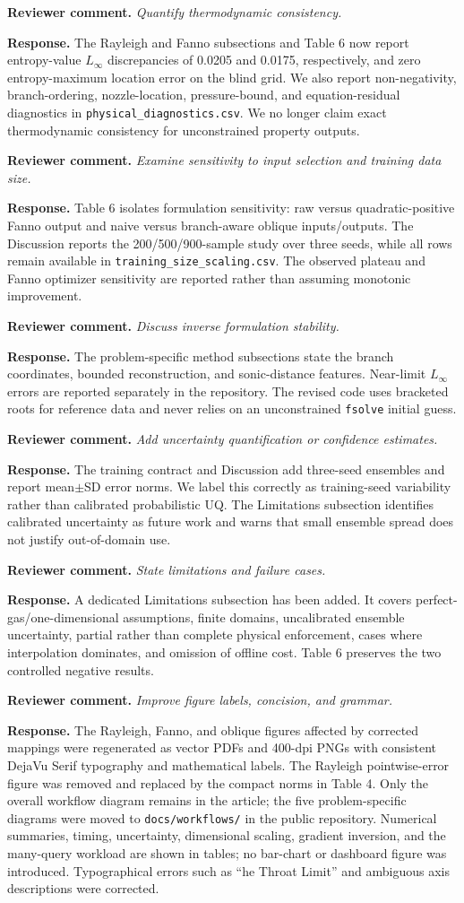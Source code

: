 \documentclass[11pt]{article}
\newcommand{\comment}[1]{\par\medskip\noindent\textbf{Reviewer comment.} \emph{#1}\par}
\newcommand{\response}[1]{\par\noindent\textcolor{responseblue}{\textbf{Response.} #1}\par\medskip}
\begin{document}
\comment{Quantify thermodynamic consistency.}
\response{The Rayleigh and Fanno subsections and Table 6 now report entropy-value $L_\infty$ discrepancies of 0.0205 and 0.0175, respectively, and zero entropy-maximum location error on the blind grid. We also report non-negativity, branch-ordering, nozzle-location, pressure-bound, and equation-residual diagnostics in \texttt{physical\_diagnostics.csv}. We no longer claim exact thermodynamic consistency for unconstrained property outputs.}

\comment{Examine sensitivity to input selection and training data size.}
\response{Table 6 isolates formulation sensitivity: raw versus quadratic-positive Fanno output and naive versus branch-aware oblique inputs/outputs. The Discussion reports the 200/500/900-sample study over three seeds, while all rows remain available in \texttt{training\_size\_scaling.csv}. The observed plateau and Fanno optimizer sensitivity are reported rather than assuming monotonic improvement.}

\comment{Discuss inverse formulation stability.}
\response{The problem-specific method subsections state the branch coordinates, bounded reconstruction, and sonic-distance features. Near-limit $L_\infty$ errors are reported separately in the repository. The revised code uses bracketed roots for reference data and never relies on an unconstrained \texttt{fsolve} initial guess.}

\comment{Add uncertainty quantification or confidence estimates.}
\response{The training contract and Discussion add three-seed ensembles and report mean$\pm$SD error norms. We label this correctly as training-seed variability rather than calibrated probabilistic UQ. The Limitations subsection identifies calibrated uncertainty as future work and warns that small ensemble spread does not justify out-of-domain use.}

\comment{State limitations and failure cases.}
\response{A dedicated Limitations subsection has been added. It covers perfect-gas/one-dimensional assumptions, finite domains, uncalibrated ensemble uncertainty, partial rather than complete physical enforcement, cases where interpolation dominates, and omission of offline cost. Table 6 preserves the two controlled negative results.}

\comment{Improve figure labels, concision, and grammar.}
\response{The Rayleigh, Fanno, and oblique figures affected by corrected mappings were regenerated as vector PDFs and 400-dpi PNGs with consistent DejaVu Serif typography and mathematical labels. The Rayleigh pointwise-error figure was removed and replaced by the compact norms in Table 4. Only the overall workflow diagram remains in the article; the five problem-specific diagrams were moved to \texttt{docs/workflows/} in the public repository. Numerical summaries, timing, uncertainty, dimensional scaling, gradient inversion, and the many-query workload are shown in tables; no bar-chart or dashboard figure was introduced. Typographical errors such as ``he Throat Limit'' and ambiguous axis descriptions were corrected.}
\end{document}
